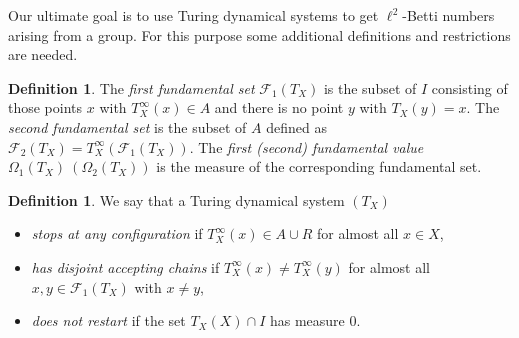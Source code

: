 \documentclass[12pt,a4paper]{scrartcl}
\theoremstyle{plain}
\theoremstyle{definition}
\newtheorem{Definition}[Theorem]{Definition}
\numberwithin{equation}{section}
\newcommand{\2}{\mathbb{Z} / 2 \mathbb{Z}}
\newcommand{\1}{\bar{1}}
\newcommand{\0}{\bar{0}}
\begin{document}
Our ultimate goal is to use Turing dynamical systems to get $\ell^2$-Betti numbers arising from a group. For this purpose some additional definitions and restrictions are needed.
\begin{Definition}
	The \emph{first fundamental set} $\mathcal{F}_1(T_X)$ is the subset of $I$ consisting of those points $x$ with $T_X^\infty(x) \in A$ and there is no point $y$ with $T_X(y)=x$. The \emph{second fundamental set} is the subset of $A$ defined as $\mathcal{F}_2(T_X)=T_X^\infty(\mathcal{F}_1(T_X))$. The \emph{first (second) fundamental value} $\Omega_1(T_X) \ ( \Omega_2(T_X))$ is the measure of the corresponding fundamental set.
\end{Definition}

\begin{Definition}
	We say that a Turing dynamical system $(T_X)$
	\begin{itemize}
		\item \emph{stops at any configuration} if $T_X^\infty (x) \in A \cup R$ for almost all $x \in X$,
		\item \emph{has disjoint accepting chains} if $T_X^\infty (x) \neq T_X^\infty (y)$ for almost all $x, y \in \mathcal{F}_1(T_X)$ with $x \neq y$,
		\item \emph{does not restart} if the set $T_X(X) \cap I$ has measure $0$.
	\end{itemize}
\end{Definition}
 
\end{document}
